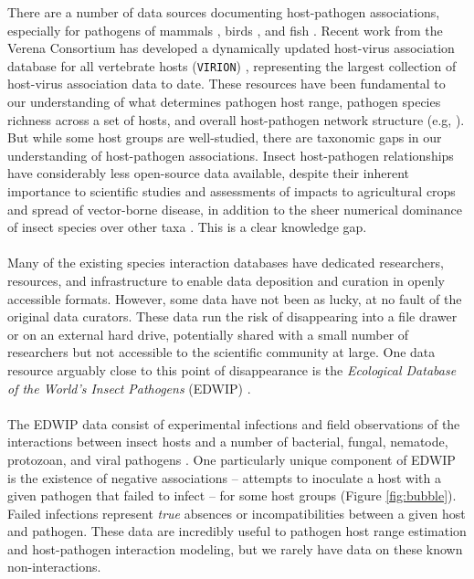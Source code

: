 \documentclass[12pt]{article}
\begin{document}
There are a number of data sources documenting host-pathogen associations, especially for pathogens of mammals \citep{gibb2021, patrick2017}, birds \citep{bensch2009}, and fish \citep{fishpest}. Recent work from the Verena Consortium has developed a dynamically updated host-virus association database for all vertebrate hosts (\texttt{VIRION}) \citep{carlson2021}, representing the largest collection of host-virus association data to date. These resources have been fundamental to our understanding of what determines pathogen host range, pathogen species richness across a set of hosts, and overall host-pathogen network structure (e.g, \citet{dallas2018, carlson2020}). But while some host groups are well-studied, there are taxonomic gaps in our understanding of host-pathogen associations. Insect host-pathogen relationships have considerably less open-source data available, despite their inherent importance to scientific studies and assessments of impacts to agricultural crops and spread of vector-borne disease, in addition to the sheer numerical dominance of insect species over other taxa \citep{stork2015}. This is a clear knowledge gap. 




\paragraph*{}
Many of the existing species interaction databases have dedicated researchers, resources, and infrastructure to enable data deposition and curation in openly accessible formats. However, some data have not been as lucky, at no fault of the original data curators. These data run the risk of disappearing into a file drawer or on an external hard drive, potentially shared with a small number of researchers but not accessible to the scientific community at large. One data resource arguably close to this point of disappearance is the \textit{Ecological Database of the World's Insect Pathogens} (EDWIP) \citep{onstad1997}. 



\paragraph*{}
The EDWIP data consist of experimental infections and field observations of the interactions between insect hosts and a number of bacterial, fungal, nematode, protozoan, and viral pathogens \citep{braxton2003}. One particularly unique component of EDWIP is the existence of negative associations -- attempts to inoculate a host with a given pathogen that failed to infect -- for some host groups (Figure \ref{fig:bubble}). Failed infections represent \textit{true} absences or incompatibilities between a given host and pathogen. These data are incredibly useful to pathogen host range estimation and host-pathogen interaction modeling, but we rarely have data on these known non-interactions. 
\end{document}
